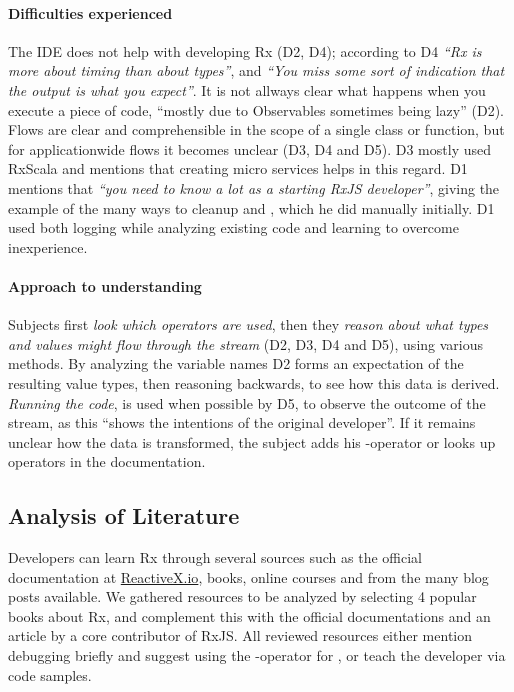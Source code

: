 \paragraph{Difficulties experienced} The IDE does not help with
developing Rx (D2, D4); according to D4 \emph{``Rx is more about timing
than about types''}, and \emph{``You miss some sort of indication that
the output is what you expect''}.  It is not allways clear what happens
when you execute a piece of code, ``mostly due to Observables sometimes
being lazy'' (D2).  Flows are clear and comprehensible in the scope of a
single class or function, but for applicationwide flows it becomes
unclear (D3, D4 and D5).  D3 mostly used RxScala and mentions that
creating micro services helps in this regard.  D1 mentions that \emph{``you
need to know a lot as a starting {\lbrack}RxJS{\rbrack} developer''},
giving the example of the many ways to cleanup and ,
which he did manually initially.  D1 used both logging while analyzing
existing code and learning to overcome inexperience.

\paragraph{Approach to understanding} Subjects first \emph{look which
operators are used}, then they \emph{reason about what types and values
might flow through the stream} (D2, D3, D4 and D5), using various
methods.  By analyzing the variable names D2 forms an expectation of the
resulting value types, then reasoning backwards, to see how this data is
derived.  \emph{Running the code}, is used when possible by D5, to
observe the outcome of the stream, as this ``shows the intentions of the
original developer''.  If it remains unclear how the data is
transformed, the subject adds his -operator or looks up
operators in the documentation.

\subsection{Analysis of Literature} Developers can learn Rx through
several sources such as the official documentation at \href{http://reactivex.io}
{ReactiveX.io}, books, online courses and from the many blog posts
available.  We gathered resources to be analyzed by selecting 4 popular
books about Rx, and complement this with the official documentations and
an article by a core contributor of RxJS.  All reviewed resources either
mention debugging briefly and suggest using the -operator for
\printfdebugging{}, or teach the developer \printfdebugging{} via code
samples.

